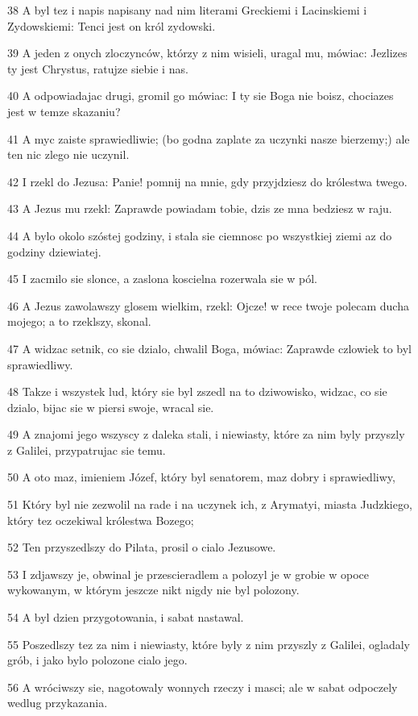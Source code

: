 \par 38 A byl tez i napis napisany nad nim literami Greckiemi i Lacinskiemi i Zydowskiemi: Tenci jest on król zydowski.
\par 39 A jeden z onych zloczynców, którzy z nim wisieli, uragal mu, mówiac: Jezlizes ty jest Chrystus, ratujze siebie i nas.
\par 40 A odpowiadajac drugi, gromil go mówiac: I ty sie Boga nie boisz, chociazes jest w temze skazaniu?
\par 41 A myc zaiste sprawiedliwie; (bo godna zaplate za uczynki nasze bierzemy;) ale ten nic zlego nie uczynil.
\par 42 I rzekl do Jezusa: Panie! pomnij na mnie, gdy przyjdziesz do królestwa twego.
\par 43 A Jezus mu rzekl: Zaprawde powiadam tobie, dzis ze mna bedziesz w raju.
\par 44 A bylo okolo szóstej godziny, i stala sie ciemnosc po wszystkiej ziemi az do godziny dziewiatej.
\par 45 I zacmilo sie slonce, a zaslona koscielna rozerwala sie w pól.
\par 46 A Jezus zawolawszy glosem wielkim, rzekl: Ojcze! w rece twoje polecam ducha mojego; a to rzeklszy, skonal.
\par 47 A widzac setnik, co sie dzialo, chwalil Boga, mówiac: Zaprawde czlowiek to byl sprawiedliwy.
\par 48 Takze i wszystek lud, który sie byl zszedl na to dziwowisko, widzac, co sie dzialo, bijac sie w piersi swoje, wracal sie.
\par 49 A znajomi jego wszyscy z daleka stali, i niewiasty, które za nim byly przyszly z Galilei, przypatrujac sie temu.
\par 50 A oto maz, imieniem Józef, który byl senatorem, maz dobry i sprawiedliwy,
\par 51 Który byl nie zezwolil na rade i na uczynek ich, z Arymatyi, miasta Judzkiego, który tez oczekiwal królestwa Bozego;
\par 52 Ten przyszedlszy do Pilata, prosil o cialo Jezusowe.
\par 53 I zdjawszy je, obwinal je przescieradlem a polozyl je w grobie w opoce wykowanym, w którym jeszcze nikt nigdy nie byl polozony.
\par 54 A byl dzien przygotowania, i sabat nastawal.
\par 55 Poszedlszy tez za nim i niewiasty, które byly z nim przyszly z Galilei, ogladaly grób, i jako bylo polozone cialo jego.
\par 56 A wróciwszy sie, nagotowaly wonnych rzeczy i masci; ale w sabat odpoczely wedlug przykazania.


